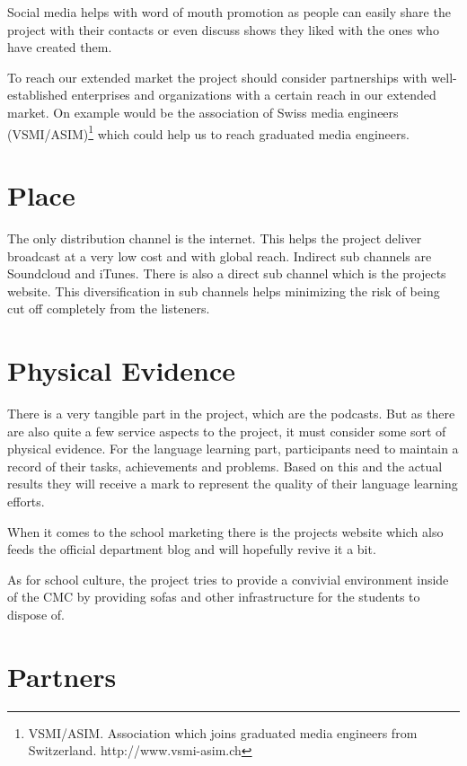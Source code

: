 Social media helps with word of mouth promotion as people can easily
share the project with their contacts or even discuss shows they liked
with the ones who have created them.

To reach our extended market the project should consider partnerships
with well-established enterprises and organizations with a certain reach
in our extended market. On example would be the association of Swiss
media engineers (VSMI/ASIM)\footnote{VSMI/ASIM. Association which joins
  graduated media engineers from Switzerland. http://www.vsmi-asim.ch}
which could help us to reach graduated media engineers.

\section{Place}\label{place}

The only distribution channel is the internet. This helps the project
deliver broadcast at a very low cost and with global reach. Indirect sub
channels are Soundcloud and iTunes. There is also a direct sub channel
which is the projects website. This diversification in sub channels
helps minimizing the risk of being cut off completely from the
listeners.

\section{Physical Evidence}\label{physical-evidence}

There is a very tangible part in the project, which are the podcasts.
But as there are also quite a few service aspects to the project, it
must consider some sort of physical evidence. For the language learning
part, participants need to maintain a record of their tasks,
achievements and problems. Based on this and the actual results they
will receive a mark to represent the quality of their language learning
efforts.

When it comes to the school marketing there is the projects website
which also feeds the official department blog and will hopefully revive
it a bit.

As for school culture, the project tries to provide a convivial
environment inside of the CMC by providing sofas and other
infrastructure for the students to dispose of.

\section{Partners}\label{partners}

